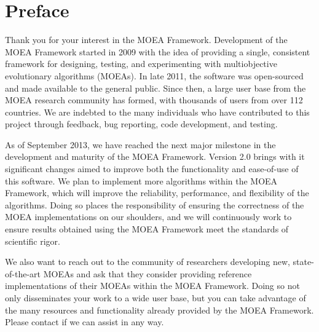 %
%

\chapter*{Preface}

Thank you for your interest in the MOEA Framework.  Development of the MOEA Framework started in 2009 with the idea of providing a single, consistent framework for designing, testing, and experimenting with multiobjective evolutionary algorithms (MOEAs).  In late 2011, the software was open-sourced and made available to the general public.  Since then, a large user base from the MOEA research community has formed, with thousands of users from over 112 countries.  We are indebted to the many individuals who have contributed to this project through feedback, bug reporting, code development, and testing.

As of September 2013, we have reached the next major milestone in the development and maturity of the MOEA Framework.  Version 2.0 brings with it significant changes aimed to improve both the functionality and ease-of-use of this software.  We plan to implement more algorithms within the MOEA Framework, which will improve the reliability, performance, and flexibility of the algorithms.  Doing so places the responsibility of ensuring the correctness of the MOEA implementations on our shoulders, and we will continuously work to ensure results obtained using the MOEA Framework meet the standards of scientific rigor.

We also want to reach out to the community of researchers developing new, state-of-the-art MOEAs and ask that they consider providing reference implementations of their MOEAs within the MOEA Framework.  Doing so not only disseminates your work to a wide user base, but you can take advantage of the many resources and functionality already provided by the MOEA Framework.  Please contact  if we can assist in any way.

